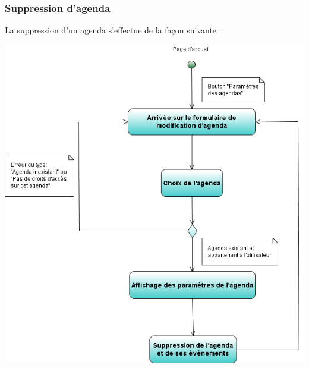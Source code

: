 \documentclass[12pt , a4paper]{article}
\begin{document}
\subsubsection{Suppression d'agenda}
\noindent La suppression d'un agenda s'effectue de la façon suivante :
\begin{center}
  \includegraphics[scale=0.6]{./images/diag_act_suppression_agenda.png}
\end{center}
\noindent 
\end{document}
